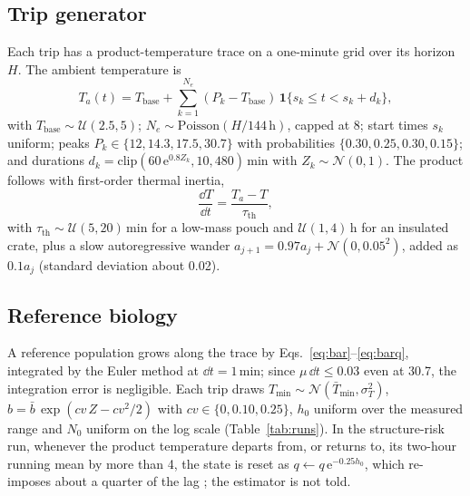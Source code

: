 \subsection{Trip generator}
Each trip has a product-temperature trace on a one-minute grid over its horizon $H$. The ambient temperature is
\begin{equation}\label{eq:amb}
T_a(t)=T_{\mathrm{base}}+\sum_{k=1}^{N_e}(P_k-T_{\mathrm{base}})\,\mathbf 1\{s_k\le t<s_k+d_k\},
\end{equation}
with $T_{\mathrm{base}}\sim\mathcal U(2.5,5)$\degC; $N_e\sim\mathrm{Poisson}(H/144\,\mathrm h)$, capped at 8; start times $s_k$ uniform; peaks $P_k\in\{12,14.3,17.5,30.7\}$\degC{} with probabilities $\{0.30,0.25,0.30,0.15\}$; and durations $d_k=\mathrm{clip}(60\,\mathrm{e}^{0.8Z_k},10,480)$\,min with $Z_k\sim\mathcal N(0,1)$. The product follows with first-order thermal inertia,
\begin{equation}\label{eq:inertia}
\frac{\dd T}{\dd t}=\frac{T_a-T}{\tau_{\mathrm{th}}},
\end{equation}
with $\tau_{\mathrm{th}}\sim\mathcal U(5,20)$\,min for a low-mass pouch and $\mathcal U(1,4)$\,h for an insulated crate, plus a slow autoregressive wander $a_{j+1}=0.97a_j+\mathcal N(0,0.05^2)$, added as $0.1a_j$ (standard deviation about 0.02\degC).

\subsection{Reference biology}
A reference population grows along the trace by Eqs.~\eqref{eq:bar}--\eqref{eq:barq}, integrated by the Euler method at $\dd t=1$\,min; since $\mu\,\dd t\le0.03$ even at 30.7\degC, the integration error is negligible. Each trip draws $T_{\min}\sim\mathcal N(\bar T_{\min},\sigma_T^2)$, $b=\bar b\,\exp(cv\,Z-cv^2/2)$ with $cv\in\{0,0.10,0.25\}$, $h_0$ uniform over the measured range and $N_0$ uniform on the log scale (Table~\ref{tab:runs}). In the structure-risk run, whenever the product temperature departs from, or returns to, its two-hour running mean by more than 4\degC, the state is reset as $q\leftarrow q\,\mathrm{e}^{-0.25h_0}$, which re-imposes about a quarter of the lag \cite{zwietering1994}; the estimator is not told.

